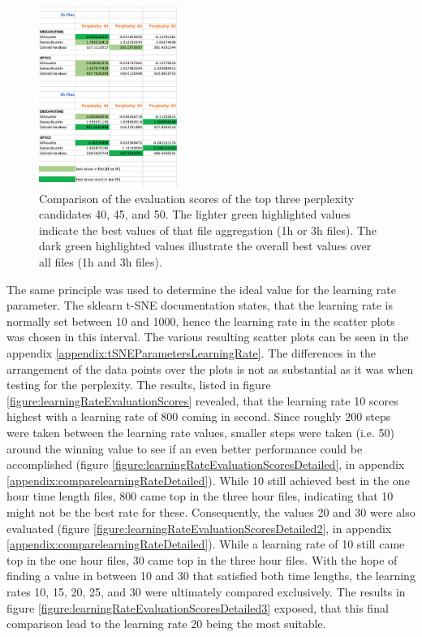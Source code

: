 \begin{figure}
  \centering
  \includegraphics[width=0.4\textwidth]{./images/tsneParametersTest/perplexity/perplexityEvaluationScoresDetailed.png}
  \caption{Comparison of the evaluation scores of the top three perplexity candidates 40, 45, and 50. The lighter green highlighted values indicate the best values of that file aggregation (1h or 3h files). The dark green highlighted values illustrate the overall best values over all files (1h and 3h files).}
  \label{figure:perplexityEvaluationScoresDetailed}
\end{figure}


The same principle was used to determine the ideal value for the learning rate parameter. The sklearn t-SNE documentation states, that the learning rate is normally set between 10 and 1000, hence the learning rate in the scatter plots was chosen in this interval.
The various resulting scatter plots can be seen in the appendix \ref{appendix:tSNEParametersLearningRate}. The differences in the arrangement of the data points over the plots is not as substantial as it was when testing for the perplexity. The results, listed in figure \ref{figure:learningRateEvaluationScores} revealed, that the learning rate 10 scores highest with a learning rate of 800 coming in second. Since roughly 200 steps were taken between the learning rate values, smaller steps were taken (i.e. 50) around the winning value to see if an even better performance could be accomplished (figure \ref{figure:learningRateEvaluationScoresDetailed}, in appendix \ref{appendix:comparelearningRateDetailed}). While 10 still achieved best in the one hour time length files, 800 came top in the three hour files, indicating that 10 might not be the best rate for these. Consequently, the values 20 and 30 were also evaluated (figure \ref{figure:learningRateEvaluationScoresDetailed2}, in appendix \ref{appendix:comparelearningRateDetailed}). While a learning rate of 10 still came top in the one hour files, 30 came top in the three hour files. With the hope of finding a value in between 10 and 30 that satisfied both time lengths, the learning rates 10, 15, 20, 25, and 30 were ultimately compared exclusively. The results in figure \ref{figure:learningRateEvaluationScoresDetailed3} exposed, that this final comparison lead to the learning rate 20 being the most suitable. 

